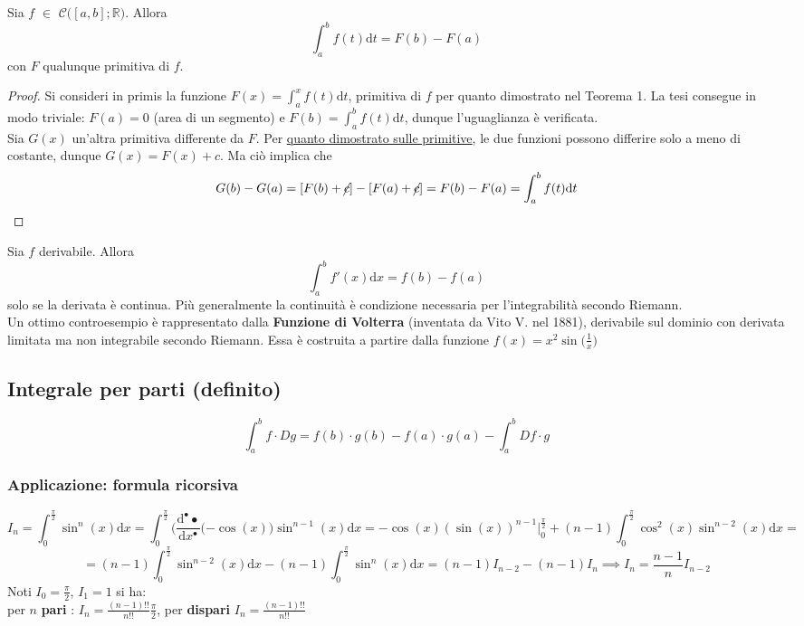 \documentclass[10pt, oneside]{book}
\theoremstyle{plain}
\begin{document}
\begin{ther}
    Sia $f$ $\in$ $\mathcal{C}\big([a,b] ; \mathbb{R}\big)$. Allora
    \[\int_a^b f(t)\textrm{d}t = F(b) - F(a)\]
    con $F$ qualunque primitiva di $f$.
\end{ther}
\begin{proof}
    Si consideri in primis la funzione $F(x) = \int_a^x f(t)\textrm{d}t$, primitiva di $f$ per quanto dimostrato nel Teorema 1. La tesi consegue in modo triviale: $F(a) = 0$ (area di un segmento) e $F(b) = \int_a^b f(t)\textrm{d}t$, dunque l'uguaglianza è verificata.
    \\Sia $G(x)$ un'altra primitiva differente da $F$. Per \hyperlink{primitive}{quanto dimostrato sulle primitive}, le due funzioni possono differire solo a meno di costante, dunque $G(x) = F(x) + c$. Ma ciò implica che
    \[G(b) - G(a) = [F(b) + \cancel{c}] - [F(a) + \cancel{c}] = F(b) - F(a) = \int_a^b f(t)\textrm{d}t\]
\end{proof}

\begin{oss}
    Sia $f$ derivabile. Allora 
    \[\int_a^b f'(x)\textrm{d}x = f(b) - f(a)\]
    solo se la derivata è continua. Più generalmente la continuità è condizione necessaria per l'integrabilità secondo Riemann.
    \\Un ottimo controesempio è rappresentato dalla \textbf{Funzione di Volterra} (inventata da Vito V. nel 1881), derivabile sul dominio con derivata limitata ma non integrabile secondo Riemann. Essa è costruita a partire dalla funzione $f(x) = x^2 \sin\big(\frac{1}{x}\big)$
\end{oss}

\subsection{Integrale per parti (definito)}
\[\boxed{\int_a^b f \cdot Dg = f(b) \cdot g(b) - f(a) \cdot g(a) - \int_a^b Df \cdot g}\]
\subsubsection{Applicazione: formula ricorsiva}
\[I_n = \int_{0}^{\frac{\pi}{2}}\sin^n(x)\textrm{d}x = \int_{0}^{\frac{\pi}{2}}\big(\frac{\textrm{d}^{•} •}{\textrm{d}x^{•}}(-\cos(x)\big)\sin^{n-1}(x)\textrm{d}x = - \cos(x) (\sin(x))^{n-1}\bigg|_{0}^{\frac{\pi}{2}} + (n-1) \int_{0}^{\frac{\pi}{2}}\cos^2(x)\sin^{n-2}(x)\textrm{d}x =\] 
\[= (n-1)\int_{0}^{\frac{\pi}{2}}\sin^{n-2}(x)\textrm{d}x - (n-1)\int_{0}^{\frac{\pi}{2}}\sin^n(x)\textrm{d}x = (n-1)I_{n-2} - (n-1)I_n \implies I_n = \frac{n-1}{n}I_{n-2}\]
Noti $\displaystyle I_0 = \frac{\pi}{2}$, $\displaystyle I_1 = 1$ si  ha:
\\per $n$ \textbf{pari} : $\displaystyle I_n = \frac{(n-1)!!}{n!!}\frac{\pi}{2}$, per \textbf{dispari} $\displaystyle I_n = \frac{(n-1)!!}{n!!}$
\end{document}
